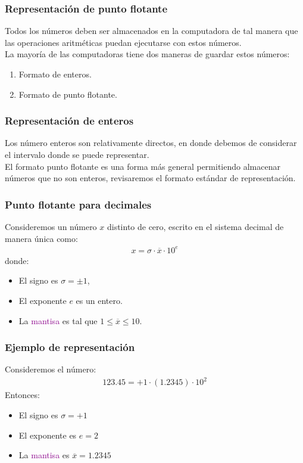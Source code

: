 \documentclass[12pt]{beamer}
\begin{document}
\begin{frame}
\frametitle{Representación de punto flotante}
Todos los números deben ser almacenados en la computadora de tal manera que las operaciones aritméticas puedan ejecutarse  con estos números.
\\
\bigskip
\pause
La mayoría de las computadoras tiene dos maneras de guardar estos números:
\begin{enumerate}[<+->]
\item Formato de enteros.
\item Formato de punto flotante.
\end{enumerate}
\end{frame}
\begin{frame}
\frametitle{Representación de enteros}
Los número enteros son relativamente directos, en donde debemos de considerar el intervalo donde se puede representar.
\\
\bigskip
\pause
El formato punto flotante es una forma más general permitiendo almacenar números que no son enteros, revisaremos el formato estándar de representación.
\end{frame}
\begin{frame}
\frametitle{Punto flotante para decimales}
Consideremos un número $x$ distinto de cero, escrito en el sistema decimal de manera única como:
\pause
\begin{align*}
x =  \sigma \cdot \overline{x} \cdot 10^{e}
\end{align*}
\pause
donde: 
\begin{itemize}[<+->]
\item[\ding{212}] El \textcolor{lava}{signo} es $\sigma= \pm 1$,
\item[\ding{212}] El \textcolor{cadmiumgreen}{exponente} $e$ es un entero.
\item[\ding{212}] La \textcolor{darkmagenta}{mantisa} es tal que $ 1 \leq \overline{x} \leq 10$.
\end{itemize}
\end{frame}
\begin{frame}
\frametitle{Ejemplo de representación}
Consideremos el número:
\begin{align*}
123.45 = + 1 \cdot (1.2345) \cdot 10^{2}
\end{align*}
\pause
Entonces:
\begin{itemize}[<+->]
\item[\ding{212}] El \textcolor{lava}{signo} es $\sigma = +1$
\item[\ding{212}] El \textcolor{cadmiumgreen}{exponente} es $e = 2$
\item[\ding{212}] La \textcolor{darkmagenta}{mantisa} es $\overline{x} =1.2345$
\end{itemize}
\end{frame}
\end{document}
